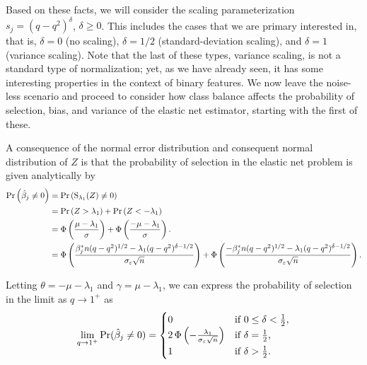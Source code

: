 Based on these facts, we will consider the scaling parameterization \(s_j = (q-q^2)^\delta\), \(\delta \geq 0\). This includes the cases that we are primary interested in, that is,
\(\delta = 0\) (no scaling), \(\delta = 1/2\) (standard-deviation scaling), and \(\delta = 1\) (variance scaling). Note that the last of these types, variance scaling, is not a standard type of normalization; yet, as we have already seen, it has some interesting properties
in the context of binary features. We now leave the noise-less scenario and proceed to consider how class balance affects the probability of selection, bias, and variance of the elastic net estimator, starting with the first of these.

A consequence of the normal error distribution and consequent normal distribution of \(Z\) is that the probability of selection in the elastic net problem is given analytically by
\begin{align*}
  \Pr\left(\hat{\beta}_j \neq 0\right) & = \Pr\left(\operatorname{S}_{\lambda_1}(Z) \neq 0\right)                                                                                                                                                                                                               \\
                                       & = \Pr\left(Z > \lambda_1\right) + \Pr\left(Z < -\lambda_1\right)                                                                                                                                                                                          \\
                                       & = \operatorname{\Phi}\left(\frac{\mu - \lambda_1}{\sigma}\right) + \operatorname{\Phi}\left(\frac{- \mu -\lambda_1}{\sigma}\right).                                                                                                                                                     \\
                                       & = \operatorname{\Phi} \left( \frac{\beta_j^*n (q-q^2)^{1/2} - \lambda_1(q-q^2)^{\delta - 1/2}}{\sigma_\varepsilon \sqrt{n}}\right)                 + \operatorname{\Phi} \left( \frac{-\beta_j^*n (q-q^2)^{1/2} - \lambda_1(q-q^2)^{\delta - 1/2}}{\sigma_\varepsilon \sqrt{n}}\right).
\end{align*}

Letting \(\theta = -\mu - \lambda_1 \) and \(\gamma = \mu - \lambda_1\), we can express the probability of selection in the limit as \(q \rightarrow 1^+\) as
\[
  \lim_{q \rightarrow 1^+} \Pr(\hat{\beta}_j \neq 0) =
  \begin{cases}
    0                                                                & \text{if } 0 \leq \delta < \frac{1}{2}, \\
    2\operatorname{\Phi}\left(-\frac{\lambda_1}{\sigma_\varepsilon \sqrt{n}}\right) & \text{if } \delta = \frac{1}{2},        \\
    1                                                                & \text{if } \delta > \frac{1}{2}.
  \end{cases}
\]


